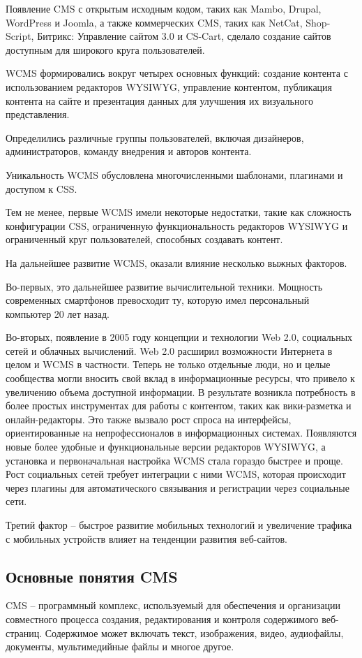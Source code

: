 Появление CMS с открытым исходным кодом, таких как Mambo, Drupal, WordPress и Joomla, а также коммерческих CMS, таких как NetCat, Shop-Script, Битрикс: Управление сайтом 3.0 и CS-Cart, сделало создание сайтов доступным для широкого круга пользователей.

WCMS формировались вокруг четырех основных функций: создание контента с использованием редакторов WYSIWYG, управление контентом, публикация контента на сайте и презентация данных для улучшения их визуального представления.

Определились различные группы пользователей, включая дизайнеров, администраторов, команду внедрения и авторов контента. 

Уникальность WCMS обусловлена многочисленными шаблонами, плагинами и доступом к CSS.

Тем не менее, первые WCMS имели некоторые недостатки, такие как сложность конфигурации CSS, ограниченную функциональность редакторов WYSIWYG и ограниченный круг пользователей, способных создавать контент.

На дальнейшее развитие WCMS, оказали влияние несколько выжных факторов.

Во-первых, это дальнейшее развитие вычислительной техники. Мощность современных смартфонов превосходит ту, которую имел персональный компьютер 20 лет назад.

Во-вторых, появление в 2005 году концепции и технологии Web 2.0, социальных сетей и облачных вычислений. Web 2.0 расширил возможности Интернета в целом и WCMS в частности. Теперь не только отдельные люди, но и целые сообщества могли вносить свой вклад в информационные ресурсы, что привело к увеличению объема доступной информации. В результате возникла потребность в более простых инструментах для работы с контентом, таких как вики-разметка и онлайн-редакторы. Это также вызвало рост спроса на интерфейсы, ориентированные на непрофессионалов в информационных системах. Появляются новые более удобные и функциональные версии редакторов WYSIWYG, а установка и первоначальная настройка WCMS стала гораздо быстрее и проще. Рост социальных сетей требует интеграции с ними WCMS, которая происходит через плагины для автоматического связывания и регистрации через социальные сети.

Третий фактор -- быстрое развитие мобильных технологий и увеличение трафика с мобильных устройств влияет на тенденции развития веб-сайтов.

\subsection{Основные понятия CMS}
CMS -- программный комплекс, используемый для обеспечения и организации совместного процесса создания, редактирования и контроля содержимого веб-страниц. Содержимое может включать текст, изображения, видео, аудиофайлы, документы, мультимедийные файлы и многое другое.

